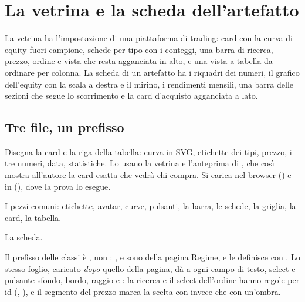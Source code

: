 \section{La vetrina e la scheda dell'artefatto}\label{sez:vetrina}

La vetrina ha l'impostazione di una piattaforma di trading: card con la curva
di equity fuori campione, schede per tipo con i conteggi, una barra di
ricerca, prezzo, ordine e vista che resta agganciata in alto, e una vista a
tabella da ordinare per colonna. La scheda di un artefatto ha i riquadri dei
numeri, il grafico dell'equity con la scala a destra e il mirino, i
rendimenti mensili, una barra delle sezioni che segue lo scorrimento e la
card d'acquisto agganciata a lato.

\subsection{Tre file, un prefisso}

\begin{description}[leftmargin = 1.4em, style = nextline, itemsep = 4pt]
  \item[\file{static/js/mkt\_card.js}] Disegna la card e la riga della
    tabella: curva in SVG, etichette dei tipi, prezzo, i tre numeri, data,
    statistiche. Lo usano la vetrina e l'anteprima di ,
    che così mostra all'autore la card esatta che vedrà chi compra. Si
    carica nel browser () e in 
    (), dove la prova lo esegue.
  \item[\file{static/css/mkt.css}] I pezzi comuni: etichette, avatar,
    curve, pulsanti, la barra, le schede, la griglia, la card, la tabella.
  \item[\file{static/css/marketplace\_item.css}] La scheda.
\end{description}

\noindent
Il prefisso delle classi è , non : ,
 e  sono della pagina Regime, e
 le definisce con . Lo stesso foglio,
caricato \emph{dopo} quello della pagina, dà a ogni campo di testo, select e
pulsante sfondo, bordo, raggio e : la
ricerca e il select dell'ordine hanno regole per id (,
), e il segmento del prezzo marca la scelta con
 invece che con un'ombra.


